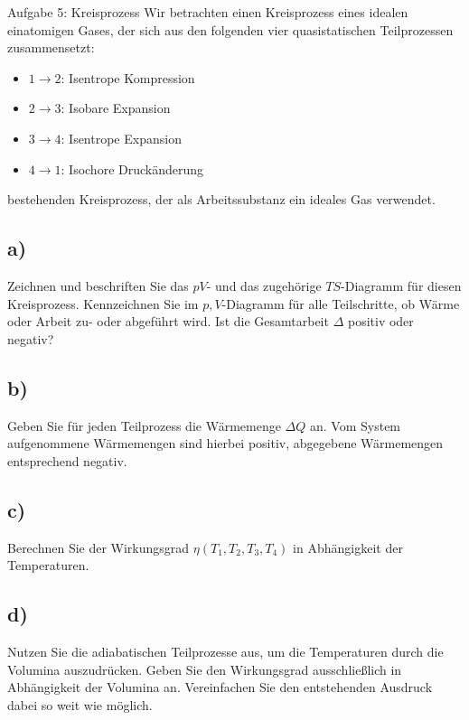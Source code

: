 \begin{aufgabe}{Aufgabe 5: Kreisprozess}
    Wir betrachten einen Kreisprozess eines idealen einatomigen Gases, der sich aus den folgenden vier quasistatischen Teilprozessen zusammensetzt:
    \begin{itemize}
        \item $1 \to 2$: Isentrope Kompression
        \item $2 \to 3$: Isobare Expansion
        \item $3 \to 4$: Isentrope Expansion
        \item $4 \to 1$: Isochore Druckänderung
    \end{itemize}
    bestehenden Kreisprozess, der als Arbeitssubstanz ein ideales Gas verwendet.

    \subsection{a)}
    Zeichnen und beschriften Sie das $pV$- und das zugehörige $TS$-Diagramm für diesen Kreisprozess.
    Kennzeichnen Sie im $p,V$-Diagramm für alle Teilschritte, ob Wärme oder Arbeit zu- oder abgeführt wird.
    Ist die Gesamtarbeit $\Delta$ positiv oder negativ?

    \subsection{b)}
    Geben Sie für jeden Teilprozess die Wärmemenge $\Delta Q$ an.
    Vom System aufgenommene Wärmemengen sind hierbei positiv, abgegebene Wärmemengen entsprechend negativ.

    \subsection{c)}
    Berechnen Sie der Wirkungsgrad $\eta(T_1, T_2, T_3, T_4)$ in Abhängigkeit der Temperaturen.

    \subsection{d)}
    Nutzen Sie die adiabatischen Teilprozesse aus, um die Temperaturen durch die Volumina auszudrücken.
    Geben Sie den Wirkungsgrad ausschließlich in Abhängigkeit der Volumina an.
    Vereinfachen Sie den entstehenden Ausdruck dabei so weit wie möglich.
\end{aufgabe}

